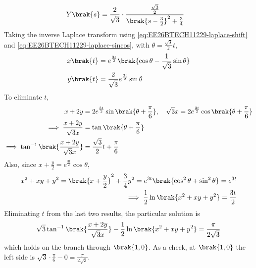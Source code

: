 \begin{enumerate}[label=\thesubsection.\arabic*, ref=\thesubsection.\theenumi]
\begin{align}
	Y\brak{s} &= \frac{2}{\sqrt{3}}\cdot\frac{\frac{\sqrt{3}}{2}}{\brak{s - \frac{3}{2}}^2 + \frac{3}{4}}
\end{align}
Taking the inverse Laplace transform using \eqref{eq:EE26BTECH11229-laplace-shift} and \eqref{eq:EE26BTECH11229-laplace-sincos}, with $\theta = \frac{\sqrt{3}}{2}t$,
\begin{align}
	x\brak{t} &= e^{\frac{3t}{2}}\brak{\cos\theta - \frac{1}{\sqrt{3}}\sin\theta}
	\\
	y\brak{t} &= \frac{2}{\sqrt{3}}e^{\frac{3t}{2}}\sin\theta
\end{align}
To eliminate $t$,
\begin{align}
	x + 2y &= 2e^{\frac{3t}{2}}\sin\brak{\theta + \frac{\pi}{6}}, \quad \sqrt{3}x = 2e^{\frac{3t}{2}}\cos\brak{\theta + \frac{\pi}{6}}
	\\
	\implies \frac{x + 2y}{\sqrt{3}x} &= \tan\brak{\theta + \frac{\pi}{6}}
	\\
	\implies \tan^{-1}\brak{\frac{x + 2y}{\sqrt{3}x}} &= \frac{\sqrt{3}}{2}t + \frac{\pi}{6}
\end{align}
Also, since $x + \frac{y}{2} = e^{\frac{3t}{2}}\cos\theta$,
\begin{align}
	x^2 + xy + y^2 = \brak{x + \frac{y}{2}}^2 + \frac{3}{4}y^2 = e^{3t}\brak{\cos^2\theta + \sin^2\theta} = e^{3t}
	\\
	\implies \frac{1}{2}\ln\brak{x^2 + xy + y^2} = \frac{3t}{2}
\end{align}
Eliminating $t$ from the last two results, the particular solution is
\begin{align}
	\sqrt{3}\tan^{-1}\brak{\frac{x + 2y}{\sqrt{3}x}} - \frac{1}{2}\ln\brak{x^2 + xy + y^2} = \frac{\pi}{2\sqrt{3}}
\end{align}
which holds on the branch through $\brak{1, 0}$. As a check, at $\brak{1, 0}$ the left side is $\sqrt{3}\cdot\frac{\pi}{6} - 0 = \frac{\pi}{2\sqrt{3}}$.


\end{enumerate}
